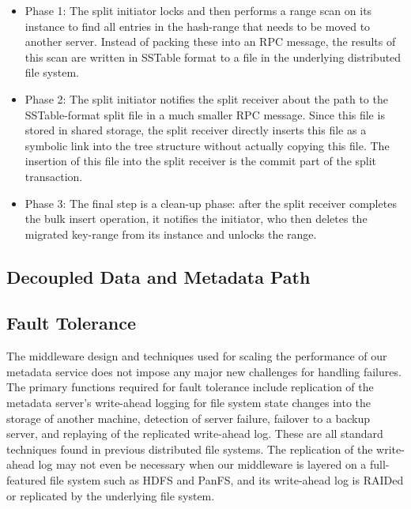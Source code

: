 \begin{itemize}
\item{Phase 1:} The split initiator locks and
then performs a range scan on its \ldb instance
to find all entries in the hash-range that needs to be moved to another server.
Instead of packing these into an RPC message,
the results of this scan are written in SSTable format to a file in the
underlying distributed file system.

\item{Phase 2:} The split initiator notifies the split receiver about
the path to the SSTable-format split file in a much smaller RPC message.
Since this file is stored in shared storage,
the split receiver directly inserts this file as a symbolic link
into the \ldb tree structure without actually copying this file.
The insertion of this file into the split receiver is the commit
part of the split transaction.

\item{Phase 3:} The final step is a clean-up phase:
after the split receiver completes the bulk insert operation, it notifies the
initiator, who then deletes the migrated key-range from its \ldb instance
and unlocks the range.
\end{itemize}


\subsection{Decoupled Data and Metadata Path}
\label{design.decouple}

\subsection{Fault Tolerance}
\label{design.fault}

The middleware design and techniques used for scaling the performance
of our metadata service does not impose any major
new challenges for handling failures.
The primary functions required for fault tolerance include
replication of the metadata server's write-ahead logging for file system
state changes into the storage of another machine,
detection of server failure, failover to a backup server,
and replaying of the replicated write-ahead log.
These are all standard techniques found in previous distributed file systems.
The replication of the write-ahead log may not even be necessary
when our middleware is layered on a full-featured file system such as HDFS and PanFS,
and its write-ahead log is RAIDed or replicated by the underlying file system.

